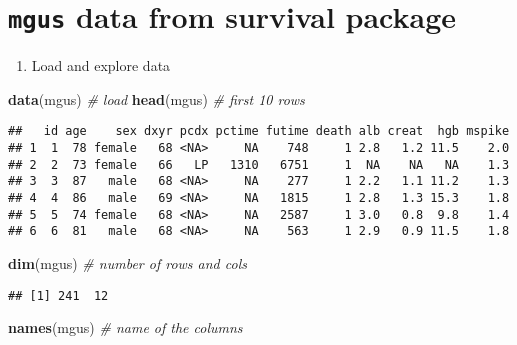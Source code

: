 \documentclass[]{book}
\newenvironment{Shaded}{\begin{snugshade}}{\end{snugshade}}
\newcommand{\KeywordTok}[1]{\textcolor[rgb]{0.13,0.29,0.53}{\textbf{{#1}}}}
\newcommand{\CommentTok}[1]{\textcolor[rgb]{0.56,0.35,0.01}{\textit{{#1}}}}
\newcommand{\NormalTok}[1]{{#1}}
\providecommand{\tightlist}{%
  \setlength{\itemsep}{0pt}\setlength{\parskip}{0pt}}
\theoremstyle{definition}
\theoremstyle{definition}
\theoremstyle{definition}
\theoremstyle{remark}
\begin{document}
\section{\texorpdfstring{\texttt{mgus} data from \textbf{survival}
package}{mgus data from survival package}}\label{mgus-data-from-survival-package}

\begin{enumerate}
\def\labelenumi{\arabic{enumi}.}
\tightlist
\item
  Load and explore data
\end{enumerate}

\begin{Shaded}
\begin{Highlighting}[]
\KeywordTok{data}\NormalTok{(mgus)                                                                }\CommentTok{# load}
\KeywordTok{head}\NormalTok{(mgus)                                                       }\CommentTok{# first 10 rows}
\end{Highlighting}
\end{Shaded}

\begin{verbatim}
##   id age    sex dxyr pcdx pctime futime death alb creat  hgb mspike
## 1  1  78 female   68 <NA>     NA    748     1 2.8   1.2 11.5    2.0
## 2  2  73 female   66   LP   1310   6751     1  NA    NA   NA    1.3
## 3  3  87   male   68 <NA>     NA    277     1 2.2   1.1 11.2    1.3
## 4  4  86   male   69 <NA>     NA   1815     1 2.8   1.3 15.3    1.8
## 5  5  74 female   68 <NA>     NA   2587     1 3.0   0.8  9.8    1.4
## 6  6  81   male   68 <NA>     NA    563     1 2.9   0.9 11.5    1.8
\end{verbatim}

\begin{Shaded}
\begin{Highlighting}[]
\KeywordTok{dim}\NormalTok{(mgus)                                              }\CommentTok{# number of rows and cols}
\end{Highlighting}
\end{Shaded}

\begin{verbatim}
## [1] 241  12
\end{verbatim}

\begin{Shaded}
\begin{Highlighting}[]
\KeywordTok{names}\NormalTok{(mgus)                                                }\CommentTok{# name of the columns}
\end{Highlighting}
\end{Shaded}
\end{document}
